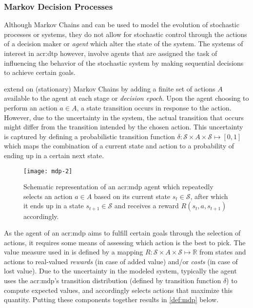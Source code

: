 \subsubsection{Markov Decision Processes}
\label{sec:mdps}


Although Markov Chains and  can be used to model the evolution of stochastic processes or systems, they do not allow for stochastic control through the actions of a decision maker or \textit{agent} which alter the state of the system.
The systems of interest in \acrshort{acr:dtp} however, involve agents that are assigned the task of influencing the behavior of the stochastic system by making sequential decisions to achieve certain goals.

 extend on (stationary) Markov Chains by adding a finite set of actions $A$ available to the agent at each stage or \textit{decision epoch}.
Upon the agent choosing to perform an action $a \in A$, a state transition occurs in response to the action.
However, due to the uncertainty in the system, the actual transition that occurs might differ from the transition intended by the chosen action.
This uncertainty is captured by defining a probabilistic transition function $\delta: \mathcal{S} \times A \times \mathcal{S} \mapsto [0,1]$ which maps the combination of a current state and action to a probability of ending up in a certain next state.

\newpage

\begin{figure}
	\centering
	\texttt{[image: mdp-2]}
	\caption{Schematic representation of an \acrshort{acr:mdp} agent which repeatedly selects an action $a \in A$ based on its current state $s_t \in \mathcal{S}$, after which it ends up in a state $s_{t+1} \in \mathcal{S}$ and receives a reward $R(s_t, a, s_{t+1})$ accordingly.}
	\label{fig:mdp}
\end{figure}

As the agent of an \acrshort{acr:mdp} aims to fulfill certain goals through the selection of actions, it requires some means of assessing which action is the best to pick.
The value measure used in  is defined by a mapping $R: \mathcal{S} \times A \times \mathcal{S} \mapsto \mathbb{R}$ from states and actions to real-valued \textit{rewards} (in case of added value) and/or \textit{costs} (in case of lost value).
Due to the uncertainty in the modeled system, typically the agent uses the \acrshort{acr:mdp}'s transition distribution (defined by transition function $\delta$) to compute expected values, and accordingly selects actions that maximize this quantity.
Putting these components together results in \autoref{def:mdp} below.

